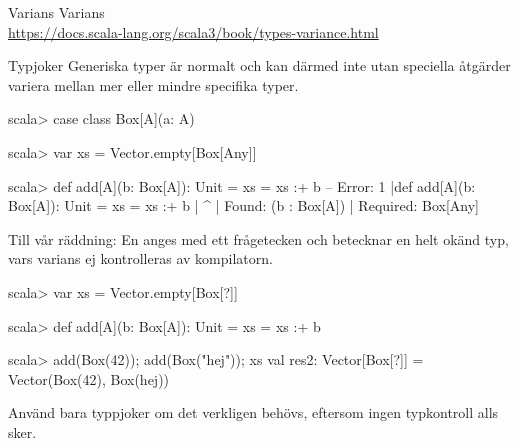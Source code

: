
\begin{Slide}{Varians}
  \TODO Varians \\ \url{https://docs.scala-lang.org/scala3/book/types-variance.html}
\end{Slide}

\begin{Slide}{Typjoker }\SlideFontSmall
Generiska typer är normalt  och kan därmed inte utan speciella åtgärder variera mellan mer eller mindre specifika typer. %
\begin{REPLsmall}
scala> case class Box[A](a: A)

scala> var xs = Vector.empty[Box[Any]]

scala> def add[A](b: Box[A]): Unit = xs = xs :+ b
-- Error:
1 |def add[A](b: Box[A]): Unit = xs = xs :+ b
  |                                         ^
  |                                         Found:    (b : Box[A])
  |                                         Required: Box[Any]
\end{REPLsmall}  
Till vår räddning: En   anges med ett frågetecken och betecknar en helt okänd typ, vars varians ej kontrolleras av kompilatorn.
\begin{REPLsmall}
scala> var xs = Vector.empty[Box[?]]

scala> def add[A](b: Box[A]): Unit = xs = xs :+ b

scala> add(Box(42)); add(Box("hej")); xs
val res2: Vector[Box[?]] = Vector(Box(42), Box(hej))
\end{REPLsmall}
Använd bara typpjoker om det verkligen behövs, eftersom ingen typkontroll alls sker.
\end{Slide}



